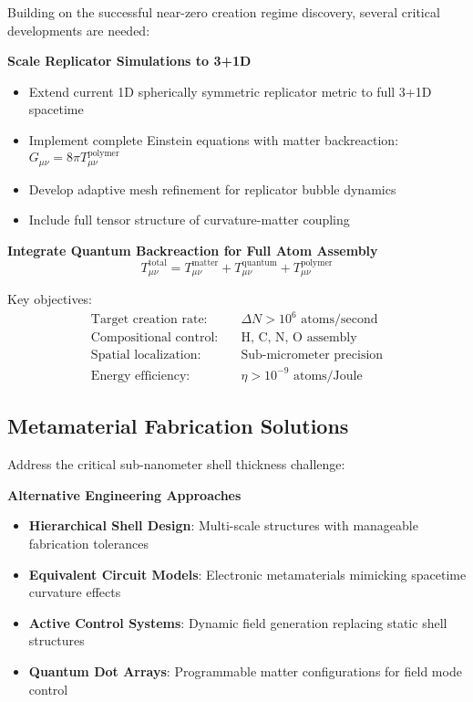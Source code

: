\documentclass[11pt]{article}
\begin{document}
Building on the successful near-zero creation regime discovery, several critical developments are needed:

\textbf{Scale Replicator Simulations to 3+1D}
\begin{itemize}
\item Extend current 1D spherically symmetric replicator metric to full 3+1D spacetime
\item Implement complete Einstein equations with matter backreaction: $G_{\mu\nu} = 8\pi T_{\mu\nu}^{\text{polymer}}$
\item Develop adaptive mesh refinement for replicator bubble dynamics
\item Include full tensor structure of curvature-matter coupling
\end{itemize}

\textbf{Integrate Quantum Backreaction for Full Atom Assembly}
\begin{equation}
T_{\mu\nu}^{\text{total}} = T_{\mu\nu}^{\text{matter}} + T_{\mu\nu}^{\text{quantum}} + T_{\mu\nu}^{\text{polymer}}
\end{equation}

Key objectives:
\begin{align}
\text{Target creation rate:} &\quad \Delta N > 10^{6} \text{ atoms/second} \\
\text{Compositional control:} &\quad \text{H, C, N, O assembly} \\
\text{Spatial localization:} &\quad \text{Sub-micrometer precision} \\
\text{Energy efficiency:} &\quad \eta > 10^{-9} \text{ atoms/Joule}
\end{align}

\subsection{Metamaterial Fabrication Solutions}

Address the critical sub-nanometer shell thickness challenge:

\textbf{Alternative Engineering Approaches}
\begin{itemize}
\item \textbf{Hierarchical Shell Design}: Multi-scale structures with manageable fabrication tolerances
\item \textbf{Equivalent Circuit Models}: Electronic metamaterials mimicking spacetime curvature effects
\item \textbf{Active Control Systems}: Dynamic field generation replacing static shell structures
\item \textbf{Quantum Dot Arrays}: Programmable matter configurations for field mode control
\end{itemize}
\end{document}
